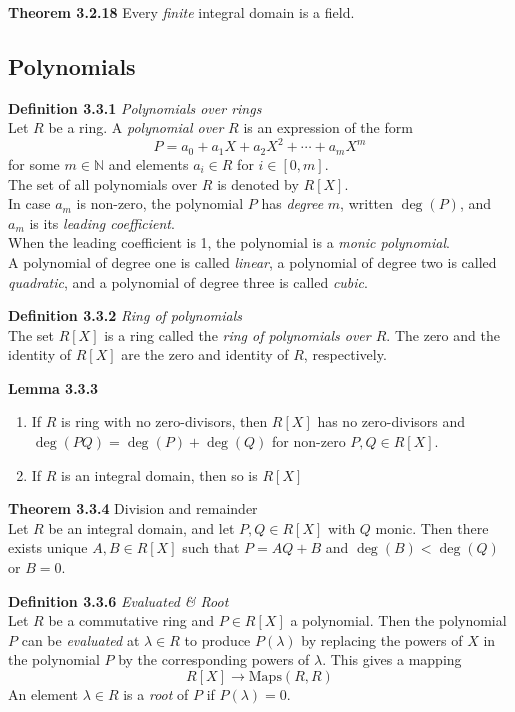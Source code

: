 \documentclass[8pt,landscape]{article}
\begin{document}
\begin{multicols}{3}
    \textbf{Theorem 3.2.18}
    Every \emph{finite} integral domain is a field.

    \subsection{Polynomials}
    \textbf{Definition 3.3.1} \emph{Polynomials over rings} \\
    Let $R$ be a ring.
    A \emph{polynomial over} $R$ is an expression of the form
    \[
        P = a_0 + a_1X + a_2{X^2} + \cdots + a_m{X^m}
    \]
    for some $m \in \mathbb{N}$ and elements $a_i \in R$ for $i \in [0,m]$.\\
    The set of all polynomials over $R$ is denoted by $R[X]$.\\
    In case $a_m$ is non-zero, the polynomial $P$ has \emph{degree} $m$, written
    $\deg(P)$, and $a_m$ is its \emph{leading coefficient}. \\
    When the leading coefficient is 1, the polynomial is a \emph{monic polynomial}.\\
    A polynomial of degree one is called \emph{linear},
    a polynomial of degree two is called \emph{quadratic},
    and a polynomial of degree three is called \emph{cubic}.

    \textbf{Definition 3.3.2} \emph{Ring of polynomials} \\
    The set $R[X]$ is a ring called the \emph{ring of polynomials over $R$}.
    The zero and the identity of $R[X]$ are the zero and identity of $R$, respectively.

    \textbf{Lemma 3.3.3}
    \begin{enumerate}
        \item If $R$ is ring with no zero-divisors, then $R[X]$ has no zero-divisors and
            $\deg(PQ) = \deg(P) + \deg(Q)$ for non-zero $P,Q \in R[X]$.
        \item If $R$ is an integral domain, then so is $R{[X]}$
    \end{enumerate}

    \textbf{Theorem 3.3.4} Division and remainder \\
    Let $R$ be an integral domain, and let $P,Q \in R[X]$ with $Q$ monic.
    Then there exists unique $A,B \in R{[X]}$ such that
    $P=AQ + B$ and $\deg(B) < \deg(Q)$ or $B=0$.

    \textbf{Definition 3.3.6} \emph{Evaluated \& Root} \\
    Let $R$ be a commutative ring and $P \in R[X]$ a polynomial.
    Then the polynomial $P$ can be \emph{evaluated} at $\lambda \in R$ to produce
    $P(\lambda)$
    by replacing the powers of $X$ in the polynomial $P$ by the corresponding powers of
    $\lambda$.
    This gives a mapping
    \[
        R[X] \to \mathrm{Maps}(R,R)
    \]
    An element $\lambda \in R$ is a \emph{root} of $P$ if $P(\lambda) = 0$.


\end{multicols}
\end{document}
